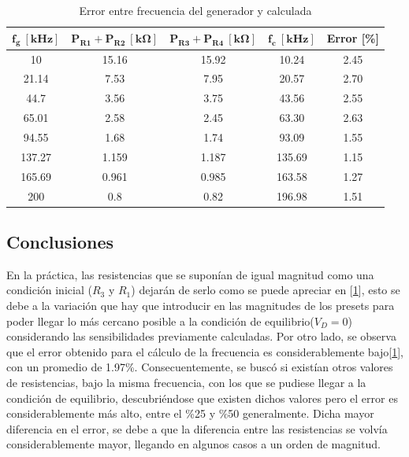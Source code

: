 \begin{table}[H]
\centering
\begin{tabular}{ccccc}
\hline
$\mathbf{f_g \ [kHz]}$ & $\mathbf{P_{R1} + P_{R2} \ [k\Omega]}$ & $\mathbf{P_{R3} + P_{R4} \ [k\Omega]}$ & $\mathbf{f_c \ [kHz]}$ & \textbf{Error [\%]} \\
\hline
10                     & 15.16                                  & 15.92                                  & 10.24                  & 2.45                \\
21.14                  & 7.53                                   & 7.95                                   & 20.57                  & 2.70                \\
44.7                   & 3.56                                   & 3.75                                   & 43.56                  & 2.55                \\
65.01                  & 2.58                                   & 2.45                                   & 63.30                  & 2.63                \\
94.55                  & 1.68                                   & 1.74                                   & 93.09                  & 1.55                \\
137.27                 & 1.159                                  & 1.187                                  & 135.69                 & 1.15                \\
165.69                 & 0.961                                  & 0.985                                  & 163.58                 & 1.27                \\
200                    & 0.8                                    & 0.82                                   & 196.98                 & 1.51   				\\
\hline            
\end{tabular}
\caption{Error entre frecuencia del generador y calculada}
\label{tab:Tabla_error}
\end{table}

\subsection{Conclusiones}

En la práctica, las resistencias que se suponían de igual magnitud como una condición inicial ($R_3$ y $R_1$) dejarán de serlo como se puede apreciar en [\ref{tab:Tabla_error}], esto se debe a la variación que hay que introducir en las magnitudes de los presets para poder llegar lo más cercano posible a la condición de equilibrio($V_D=0$) considerando las sensibilidades previamente calculadas.
Por otro lado, se observa que el error obtenido para el cálculo de la frecuencia es  considerablemente bajo[\ref{tab:Tabla_error}], con un promedio de 1.97\%. Consecuentemente, se buscó si existían otros valores de resistencias, bajo la misma frecuencia, con los que se pudiese llegar a la condición de equilibrio, descubriéndose que existen dichos valores pero el error es considerablemente más alto, entre el \%25 y \%50 generalmente. Dicha mayor diferencia en el error, se debe a que la diferencia entre las resistencias se volvía considerablemente mayor, llegando en algunos casos a un orden de magnitud. 
